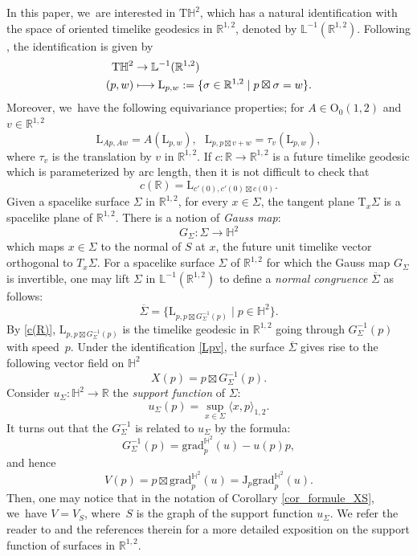 \documentclass[JEP,XML,SOM,Unicode,NoEqCountersInSection, NoFloatCountersInSection,published]{cedram}
\newcommand\mto{\mathchoice{\longmapsto}{\mapsto}{\mapsto}{\mapsto}}
\theoremstyle{plain}
\theoremstyle{definition}
\newcommand{\minko}{\mathbb{R}^{1,2}}
\newcommand{\grad}{\mathrm{grad}^{\mathbb{H}^2}}
\newcommand{\J}{\mathrm{J}}
\newcommand{\inner}[1] {\langle #1 \rangle}
\begin{document}
In this paper, we~are interested in $\mathrm{T}\mathbb{H}^2$, which has a natural identification with the space of oriented timelike geodesics in $\minko$, denoted by $\mathbb{L}^{-1}(\minko)$. Following \cite[\S 6.6]{DGK_complete_lorentz}, the identification is given by
\begin{equation}\label{Lpv}
\begin{aligned}
\mathrm{T}\mathbb{H}^2 & \to \mathbb{L}^{-1}(\minko) \\
(p,w) & \mto \mathrm{L}_{p,w}:=\{\sigma\in\minko \mid p\boxtimes\sigma=w\}.
\end{aligned}
\end{equation}
Moreover, we~have the following equivariance properties; for $A\in \mathrm{O}_0(1,2)$ and $v\in\minko$
\begin{equation}
\mathrm{L}_{Ap,Aw}=A(\mathrm{L}_{p,w}),\ \ \ \mathrm{L}_{p,p\boxtimes v+w}=\tau_v(\mathrm{L}_{p,w}),
\end{equation} where $\tau_v$ is the translation by $v$ in $\minko$.
If $c:\mathbb{R}\to\minko$ is a future timelike geodesic which is parameterized by arc length, then it is not difficult to check that
\begin{equation}\label{c(R)}
c(\mathbb{R})=\mathrm{L}_{c'(0),c'(0)\boxtimes c(0)}.
\end{equation}
Given a spacelike surface $\Sigma$ in $\minko$, \ie for every $x\in\Sigma$, the tangent plane $\mathrm{T}_x\Sigma$ is a spacelike plane of $\minko$. There is a notion of \emph{Gauss map}:
\[
G_{\Sigma}:\Sigma\to\mathbb{H}^2
\]
which maps $x\in\Sigma$ to the normal of $S$ at $x$, \ie the future unit timelike vector orthogonal to $T_x\Sigma$. For a spacelike surface $\Sigma$ of $\minko$ for which the Gauss map $G_{\Sigma}$ is invertible, one may lift $\Sigma$ in $\mathbb{L}^{-1}(\minko)$ to define a \emph{normal congruence} $\overline{\Sigma}$ as follows:
\begin{equation}
\overline{\Sigma}=\{\mathrm{L}_{p,p\boxtimes G^{-1}_{\Sigma}(p)}\mid p\in\mathbb{H}^2\}.
\end{equation}
By \eqref{c(R)}, $\mathrm{L}_{p,p\boxtimes G^{-1}_{\Sigma}(p)}$ is the timelike geodesic in $\minko$ going through $G_{\Sigma}^{-1}(p)$ with speed~$p$.
Under the identification \eqref{Lpv}, the surface $\overline{\Sigma}$ gives rise to the following vector field on $\mathbb{H}^2$
\[
X(p)=p\boxtimes G_{\Sigma}^{-1}(p).
\]
Consider $u_{\Sigma}:\mathbb{H}^2\to\mathbb{R}$ the \emph{support function} of $\Sigma$:
\[
u_{\Sigma}(p)=\sup_{x\in\Sigma}\inner{x,p}_{1,2}.
\]It turns out that the $G_{\Sigma}^{-1}$ is related to $u_{\Sigma}$ by the formula:
\[
G_{\Sigma}^{-1}(p)=\grad_p(u)-u(p)p,
\]
and hence
\[
V(p)=p\boxtimes \grad_p(u)=\J_p\grad_p(u).
\]
Then, one may notice that in the notation of Corollary \ref{cor_formule_XS}, we~have $V=V_S$, where~$S$ is the graph of the support function $u_{\Sigma}$.
We refer the reader to \cite{BS17} and the references therein for a more detailed exposition on the support function of surfaces in $\minko$.
\end{document}
